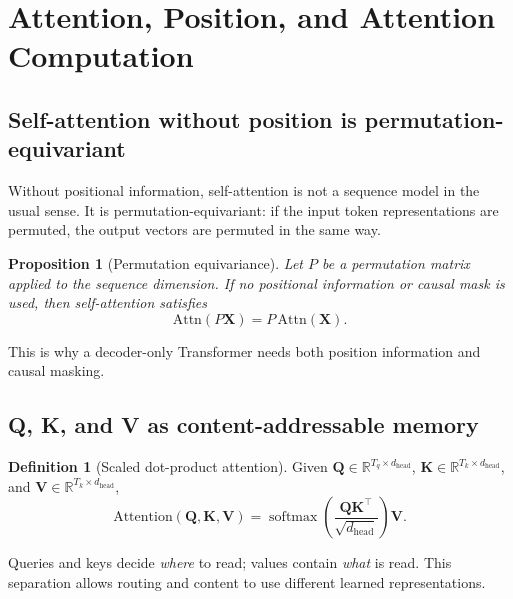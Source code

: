 \documentclass[11pt,a4paper]{article}
\theoremstyle{definition}
\newtheorem{definition}{Definition}[section]
\theoremstyle{plain}
\newtheorem{proposition}{Proposition}[section]
\newcommand{\mQ}{\bm{Q}}
\newcommand{\mK}{\bm{K}}
\newcommand{\mV}{\bm{V}}
\newcommand{\mX}{\bm{X}}
\newcommand{\reals}{\mathbb{R}}
\newcommand{\dhead}{d_{\mathrm{head}}}
\DeclareMathOperator{\softmax}{softmax}
\begin{document}
\section{Attention, Position, and Attention Computation}
\label{sec:attention-position}

\subsection{Self-attention without position is permutation-equivariant}

Without positional information, self-attention is not a sequence model in the usual sense. It is permutation-equivariant: if the input token representations are permuted, the output vectors are permuted in the same way.

\begin{proposition}[Permutation equivariance]
Let $P$ be a permutation matrix applied to the sequence dimension. If no positional information or causal mask is used, then self-attention satisfies
\begin{equation}
    \mathrm{Attn}(P\mX)=P\,\mathrm{Attn}(\mX).
\end{equation}
\end{proposition}
This is why a decoder-only Transformer needs both position information and causal masking.

\subsection{Q, K, and V as content-addressable memory}

\begin{definition}[Scaled dot-product attention]
Given $\mQ\in\reals^{T_q\times\dhead}$, $\mK\in\reals^{T_k\times\dhead}$, and $\mV\in\reals^{T_k\times\dhead}$,
\begin{equation}\label{eq:attention}
    \mathrm{Attention}(\mQ,\mK,\mV)=
    \softmax\!\left(\frac{\mQ\mK^\top}{\sqrt{\dhead}}\right)\mV.
\end{equation}
\end{definition}

Queries and keys decide \emph{where} to read; values contain \emph{what} is read. This separation allows routing and content to use different learned representations.
\end{document}
